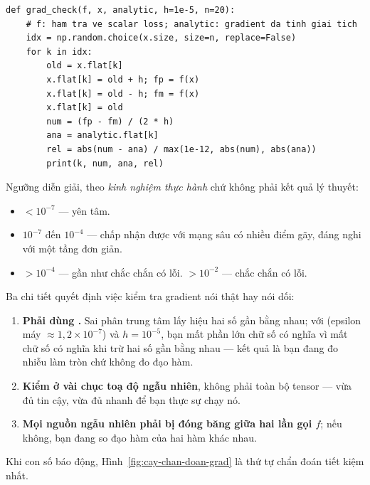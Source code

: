 \documentclass[../../../deep_learning.tex]{subfiles}
\begin{document}
\begin{lstlisting}[style=py]
def grad_check(f, x, analytic, h=1e-5, n=20):
    # f: ham tra ve scalar loss; analytic: gradient da tinh giai tich
    idx = np.random.choice(x.size, size=n, replace=False)
    for k in idx:
        old = x.flat[k]
        x.flat[k] = old + h; fp = f(x)
        x.flat[k] = old - h; fm = f(x)
        x.flat[k] = old
        num = (fp - fm) / (2 * h)
        ana = analytic.flat[k]
        rel = abs(num - ana) / max(1e-12, abs(num), abs(ana))
        print(k, num, ana, rel)
\end{lstlisting}

Ngưỡng diễn giải, theo \emph{kinh nghiệm thực hành} chứ không phải kết quả lý thuyết:

\begin{itemize}
\item $< 10^{-7}$ --- yên tâm.
\item $10^{-7}$ đến $10^{-4}$ --- chấp nhận được với mạng sâu có nhiều điểm gãy, đáng nghi với một tầng đơn giản.
\item $> 10^{-4}$ --- gần như chắc chắn có lỗi. \quad $> 10^{-2}$ --- chắc chắn có lỗi.
\end{itemize}

Ba chi tiết quyết định việc kiểm tra gradient nói thật hay nói dối:

\begin{enumerate}
\item \textbf{Phải dùng .} Sai phân trung tâm lấy hiệu hai số gần bằng nhau; với  (epsilon máy $\approx 1{,}2{\times}10^{-7}$) và $h = 10^{-5}$, bạn mất phần lớn chữ số có nghĩa vì mất chữ số có nghĩa khi trừ hai số gần bằng nhau --- kết quả là bạn đang đo nhiễu làm tròn chứ không đo đạo hàm.
\item \textbf{Kiểm ở vài chục toạ độ ngẫu nhiên}, không phải toàn bộ tensor --- vừa đủ tin cậy, vừa đủ nhanh để bạn thực sự chạy nó.
\item \textbf{Mọi nguồn ngẫu nhiên phải bị đóng băng giữa hai lần gọi $f$}; nếu không, bạn đang so đạo hàm của hai hàm khác nhau.
\end{enumerate}

Khi con số báo động, Hình~\ref{fig:cay-chan-doan-grad} là thứ tự chẩn đoán tiết kiệm nhất.
\end{document}
